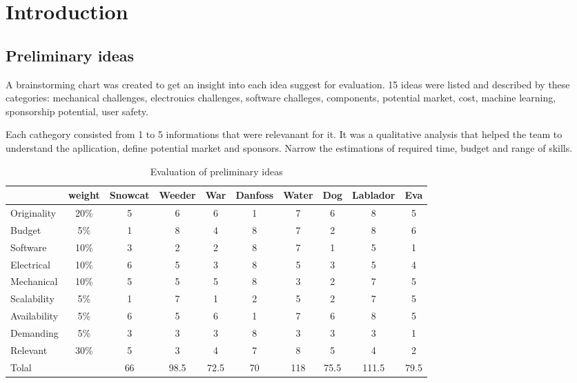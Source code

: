 \chapter{Introduction}

\section{Preliminary ideas}
A brainstorming chart was created to get an insight into 
each idea suggest for evaluation.
15 ideas were listed and described by these categories: 
mechanical challenges, electronics challenges, 
software challeges, components, potential market, cost, machine learning, 
sponsorship potential, user safety.

Each cathegory consisted from 1 to 5 informations that were relevanant for it. 
It was a qualitative analysis that helped the team to understand the apllication, 
define potential market and sponsors. Narrow the estimations of required time, budget and range of skills.



\begin{table}[h!]
    \centering
\begin{tabular}{|p{3cm }|c|c|c|c|c|c|c|c|c| }
    
\hline
 &weight& Snowcat & Weeder & War & Danfoss & Water & Dog & Lablador & Eva  \\
\hline
Originality & 20\% & 5 & 6 & 6 & 1 & 7 & 6 & 8 & 5  \\
Budget & 5\% & 1 & 8  & 4 & 8 & 7 & 2 & 8 & 6 \\
Software & 10\% & 3 & 2  & 2 & 8 & 7 & 1 & 5 & 1 \\
Electrical & 10\% & 6 & 5 & 3 & 8 & 5 & 3 & 5 & 4\\
Mechanical & 10\%& 5 & 5 & 5 & 8 & 3 & 2 & 7 & 5 \\
Scalability & 5\%& 1 & 7 & 1 & 2 & 5 & 2 & 7 & 5\\
Availability & 5\%& 6 & 5 & 6 & 1 & 7 & 6 & 8 & 5 \\
Demanding & 5\% & 3 & 3 & 3 & 8 & 3 & 3 & 3 & 1 \\
Relevant & 30\% & 5 & 3 & 4& 7& 8 & 5 & 4&2\\
\hline
Tolal & &66 & 98.5 & 72.5 & 70 & 118 & 75.5 & 111.5 & 79.5 \\


\hline
\end{tabular}
 \caption{Evaluation of preliminary ideas }
    \label{tab:Preliminary_ideas}

\end{table}

